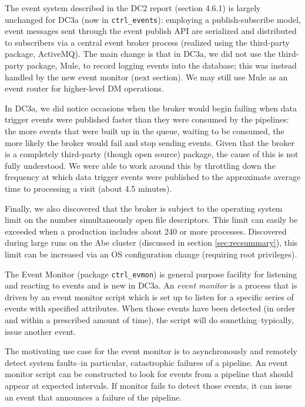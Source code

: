  \label{sec:events}

The event system described in the DC2 report (section 4.6.1) is
largely unchanged for DC3a (now in {\tt ctrl\_events}):  employing a
publish-subscribe model, event messages sent through the event publish
API are serialized and distributed to subscribers via a central event
broker process (realized using the third-party package, ActiveMQ).
The main change is that in DC3a, we did not use the third-party
package, Mule, to record logging events into the database; this was
instead handled by the new event monitor (next section).  We may still
use Mule as an event router for higher-level DM operations.   

\label{brokerprob} In DC3a, we did notice occasions when the
broker would begin failing when data trigger events were published
faster than they were consumed by the pipelines:  the more events that
were built up in the queue, waiting to be consumed, the more likely
the broker would fail and stop sending events.  Given that the broker
is a completely third-party (though open source) package, the cause of
this is not fully understood.  We were able to work around this by
throttling down the frequency at which data trigger events were
published to the approximate average time to processing a visit (about
4.5 minutes).  

Finally, we also discovered that the broker is subject to the
operating system limit on the number simultaneously open file
descriptors.  This limit can easily be exceeded when a production
includes about 240 or more processes.  Discovered during large runs on
the Abe cluster (discussed in section \ref{sec:recsummary}), this
limit can be increased via an OS configuration change (requiring root
privileges).  

 \label{sec:evmon}

The Event Monitor (package {\tt ctrl\_evmon}) is general purpose
facility for listening and reacting to events and is new in DC3a.  An
{\it event monitor} is a process that is driven by an event monitor
script which is set up to listen for a specific series of events with
specified attributes.  When those events have been detected (in order
and within a prescribed amount of time), the script will do
something--typically, issue another event.  

The motivating use case for the event monitor is to asynchronously and
remotely detect system faults--in particular, catastrophic failures of
a pipeline.  An event monitor script can be constructed to look for
events from a pipeline that should appear at expected intervals.  If
monitor fails to detect those events, it can issue an event that
announces a failure of the pipeline.

